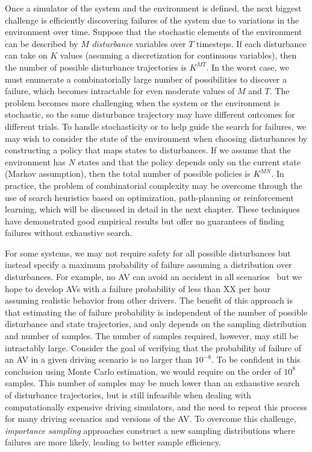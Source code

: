 Once a simulator of the system and the environment is defined, the next biggest challenge is efficiently discovering failures of the system due to variations in the environment over time. Suppose that the stochastic elements of the environment can be described by $M$ \emph{disturbance} variables over $T$ timesteps. If each disturbance can take on $K$ values (assuming a discretization for continuous variables), then the number of possible disturbance trajectories is $K^{MT}$. In the worst case, we must enumerate a combinatorially large number of possibilities to discover a failure, which becomes intractable for even moderate values of $M$ and $T$. The problem becomes more challenging when the system or the environment is stochastic, so the same disturbance trajectory may have different outcomes for different trials. To handle stochasticity or to help guide the search for failures, we may wish to consider the state of the environment when choosing disturbances by constructing a policy that maps states to disturbances. If we assume that the environment has $N$ states and that the policy depends only on the current state (Markov assumption), then the total number of possible policies is $K^{MN}$. In practice, the problem of combinatorial complexity may be overcome through the use of search heuristics based on optimization, path-planning or reinforcement learning, which will be discussed in detail in the next chapter. These techniques have demonstrated good empirical results but offer no guarantees of finding failures without exhaustive search.

For some systems, we may not require safety for all possible disturbances but instead specify a maximum probability of failure assuming a distribution over disturbances. For example, no AV can avoid an accident in all scenarios~\cite{shalev2017formal} but we hope to develop AVs with a failure probability of less than XX per hour~\cite{todo} assuming realistic behavior from other drivers. The benefit of this approach is that estimating the of failure probability is independent of the number of possible disturbance and state trajectories, and only depends on the sampling distribution and number of samples. The number of samples required, however, may still be intractably large. Consider the goal of verifying that the probability of failure of an AV in a given driving scenario is no larger than $10^{-8}$. To be confident in this conclusion using Monte Carlo estimation, we would require on the order of $10^8$ samples. This number of samples may be much lower than an exhaustive search of disturbance trajectories, but is still infeasible when dealing with computationally expensive driving simulators, and the need to repeat this process for many driving scenarios and versions of the AV. To overcome this challenge, \emph{importance sampling} approaches construct a new sampling distributions where failures are more likely, leading to better sample efficiency. 

